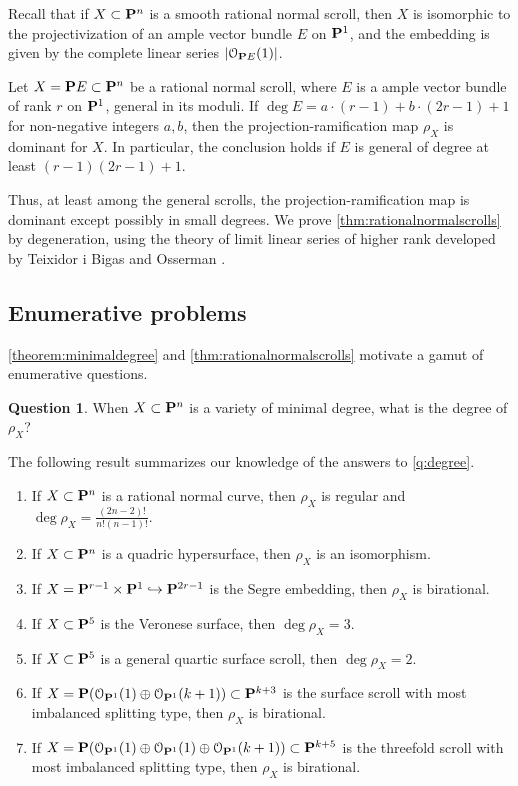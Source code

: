 \documentclass[11pt,reqno]{amsart}
\theoremstyle{plain}
\theoremstyle{definition}
\newtheorem{question}[theorem]{Question}
\theoremstyle{remark}
\numberwithin{equation}{section}
\numberwithin{equation}{section}
\renewcommand{\O}{\mathcal O}
\begin{document}
Recall that if $X \subset \P^n$ is a smooth rational normal scroll, then $X$ is isomorphic to the projectivization of an ample vector bundle $E$ on $\P^1$, and the embedding is given by the complete linear series $|\O_{\P E}(1)|$.
\begin{maintheorem}
  \label{thm:rationalnormalscrolls}
  Let $X = \P E \subset \P^n$ be a rational normal scroll, where $E$ is a ample vector bundle of rank $r$ on $\P^1$, general in its moduli.
  If $\deg E = a \cdot (r-1) + b \cdot (2r-1) + 1$ for non-negative integers $a, b$, then the projection-ramification map $\rho_X$ is dominant for $X$.
  In particular, the conclusion holds if $E$ is general of degree at least $(r-1)(2r-1) + 1$.
\end{maintheorem}
Thus, at least among the general scrolls, the projection-ramification map is dominant except possibly in small degrees.
We prove \autoref{thm:rationalnormalscrolls} by degeneration, using the theory of limit linear series of higher rank developed by Teixidor i Bigas \cite{tei:} and Osserman \cite{oss:14}.

\subsection{Enumerative problems}
\autoref{theorem:minimaldegree} and \autoref{thm:rationalnormalscrolls} motivate a gamut of enumerative questions.
\begin{question}\label{q:degree}
 When $X \subset \P^n$ is a variety of minimal degree, what is the degree of $\rho_X$?
\end{question}


The following result summarizes our knowledge of the answers to \autoref{q:degree}.
\begin{maintheorem}\label{Thm:Examples}\mbox{}
\begin{enumerate}
  \item If $X \subset \P^{n}$ is a rational normal curve, then $\rho_X$ is regular and $\deg \rho_{X} = \frac{(2n-2)!}{n!(n-1)!}$.
  \item  If $X \subset \P^{n}$ is a quadric hypersurface, then $\rho_{X}$ is an isomorphism.

  \item  If  $X = \P^{r-1} \times \P^{1} \hookrightarrow \P^{2r-1}$ is the Segre embedding, then $ \rho_{X}$ is birational.

  \item  If $X \subset \P^{5}$ is the Veronese surface, then $ \deg \rho_{X} = 3$.
  \item If $X \subset \P^{5}$ is a general quartic surface scroll, then $\deg \rho_{X} = 2$.
  \item If $X = \P(\O_{\P^{1}}(1) \oplus \O_{\P^{1}}(k+1)) \subset \P^{k+3}$ is the surface scroll with most imbalanced splitting type, then $\rho_{X}$ is birational.
  \item If $X = \P(\O_{\P^{1}}(1) \oplus \O_{\P^{1}}(1) \oplus \O_{\P^{1}}(k+1)) \subset \P^{k+5}$ is the threefold scroll with most imbalanced splitting type, then $\rho_{X}$ is birational.
\end{enumerate} 
\end{maintheorem}
\end{document}
